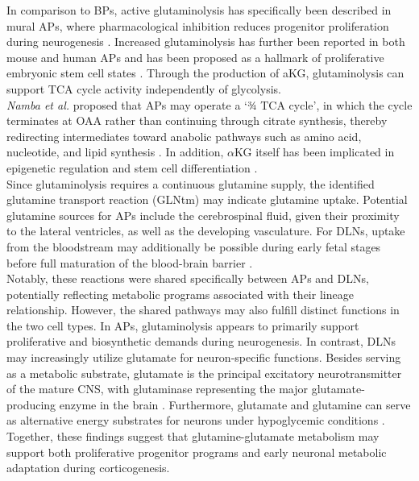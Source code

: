 In comparison to BPs, active glutaminolysis has specifically been described in mural  APs, where pharmacological inhibition reduces progenitor proliferation during neurogenesis \citep{nambaHumanSpecificARHGAP11BActs2020,journiacCellMetabolicAlterations2020}.
Increased glutaminolysis has further been reported in both mouse and human APs and has been proposed as a hallmark of proliferative embryonic stem cell states \citep{yangGlutaminolysisHallmarkCancer2017,journiacCellMetabolicAlterations2020}. Through the production of aKG, glutaminolysis can support TCA cycle activity independently of glycolysis.
\\

\textit{Namba et al.} proposed that APs may operate a ‘¾ TCA cycle’, in which the cycle terminates at OAA rather than continuing through citrate synthesis, thereby redirecting intermediates toward anabolic pathways such as amino acid, nucleotide, and lipid synthesis \citep{nambaMetabolicRegulationNeocortical2021}.
In addition, $\alpha$KG itself has been implicated in epigenetic regulation and stem cell differentiation \citep{yaoEpigeneticMechanismsNeurogenesis2016}.
\\

Since glutaminolysis requires a continuous glutamine supply, the identified glutamine transport reaction (GLNtm) may indicate glutamine uptake. Potential glutamine sources for APs include the cerebrospinal fluid, given their proximity to the lateral ventricles, as well as the developing vasculature. For DLNs, uptake from the bloodstream may additionally be possible during early fetal stages before full maturation of the blood-brain barrier \citep{goasdoueReviewBloodbrainBarrier2017}.
\\


Notably, these reactions were shared specifically between APs and DLNs, potentially reflecting metabolic programs associated with their lineage relationship. However, the shared pathways may also fulfill distinct functions in the two cell types. In APs, glutaminolysis appears to primarily support proliferative and biosynthetic demands during neurogenesis. In contrast, DLNs may increasingly utilize glutamate for neuron-specific functions. Besides serving as a metabolic substrate, glutamate is the principal excitatory neurotransmitter of the mature CNS, with glutaminase representing the major glutamate-producing enzyme in the brain 
\citep{marquezNewInsightsBrain2009}. Furthermore, glutamate and glutamine can serve as alternative energy substrates for neurons under hypoglycemic conditions \citep{mckennaGlutamateglutamineCycleNot2007}. Together, these findings suggest that glutamine-glutamate metabolism may support both proliferative progenitor programs and early neuronal metabolic adaptation during corticogenesis. 

